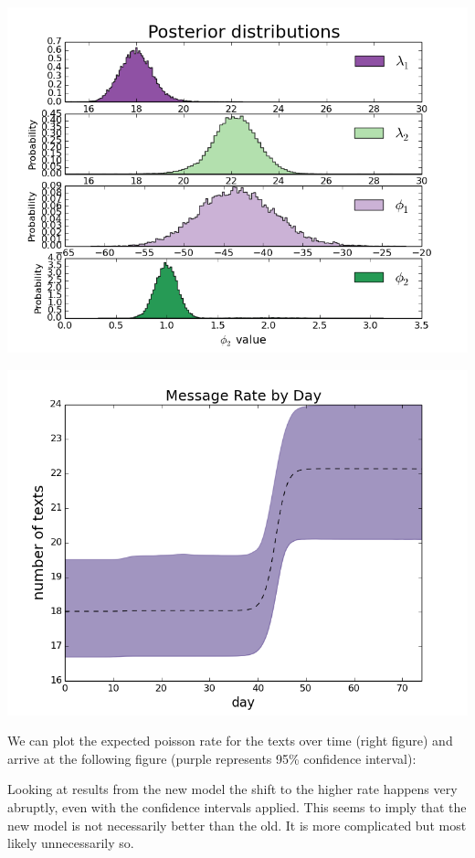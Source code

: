 \documentclass[]{article}
\begin{document}
\begin{enumerate}
\begin{multicols}{2}
\centerline{\includegraphics[scale = 0.4]{2b_final.png}}

\centerline{\includegraphics[scale = 0.4]{sigmoid_final.png}} 
\end{multicols}

We can plot the expected poisson rate for the texts over time (right figure) and arrive at the following figure (purple represents 95\% confidence interval):

Looking at results from the new model the shift to the higher rate happens very abruptly, even with the confidence intervals applied. This seems to imply that the new model is not necessarily better than the old. It is more complicated but most likely unnecessarily so. 

\end{enumerate}
\end{document}
